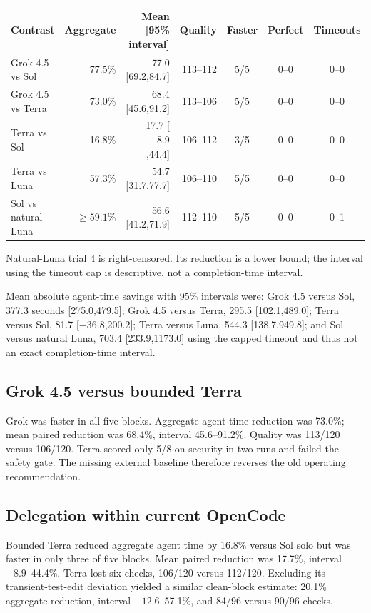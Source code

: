 \documentclass[11pt,oneside]{article}
\begin{document}
\begin{center}
\scriptsize
\begin{tabularx}{\textwidth}{@{}Xrrrccc@{}}
\toprule
Contrast & Aggregate & Mean [95\% interval] & Quality & Faster & Perfect & Timeouts \\
\midrule
Grok 4.5 vs Sol & 77.5\% & 77.0 [69.2,84.7] & 113--112 & 5/5 & 0--0 & 0--0 \\
Grok 4.5 vs Terra & 73.0\% & 68.4 [45.6,91.2] & 113--106 & 5/5 & 0--0 & 0--0 \\
Terra vs Sol & 16.8\% & 17.7 [$-8.9$,44.4] & 106--112 & 3/5 & 0--0 & 0--0 \\
Terra vs Luna & 57.3\% & 54.7 [31.7,77.7] & 106--110 & 5/5 & 0--0 & 0--0 \\
Sol vs natural Luna & $\geq59.1$\% & 56.6 [41.2,71.9] & 112--110 & 5/5 & 0--0 & 0--1 \\
\bottomrule
\end{tabularx}
\end{center}

Natural-Luna trial 4 is right-censored. Its reduction is a lower bound; the
interval using the timeout cap is descriptive, not a completion-time interval.

Mean absolute agent-time savings with 95\% intervals were: Grok 4.5 versus Sol,
377.3 seconds [275.0,479.5]; Grok 4.5 versus Terra, 295.5 [102.1,489.0]; Terra
versus Sol, 81.7 [$-36.8$,200.2]; Terra versus Luna, 544.3 [138.7,949.8]; and
Sol versus natural Luna, 703.4 [233.9,1173.0] using the capped timeout and thus
not an exact completion-time interval.

\subsection{Grok 4.5 versus bounded Terra}

Grok was faster in all five blocks. Aggregate agent-time reduction was 73.0\%;
mean paired reduction was 68.4\%, interval 45.6--91.2\%. Quality was 113/120
versus 106/120. Terra scored only 5/8 on security in two runs and failed the
safety gate. The missing external baseline therefore reverses the old operating
recommendation.

\subsection{Delegation within current OpenCode}

Bounded Terra reduced aggregate agent time by 16.8\% versus Sol solo but was
faster in only three of five blocks. Mean paired reduction was 17.7\%, interval
$-8.9$--44.4\%. Terra lost six checks, 106/120 versus 112/120. Excluding its
transient-test-edit deviation yielded a similar clean-block estimate: 20.1\%
aggregate reduction, interval $-12.6$--57.1\%, and 84/96 versus 90/96 checks.
\end{document}
